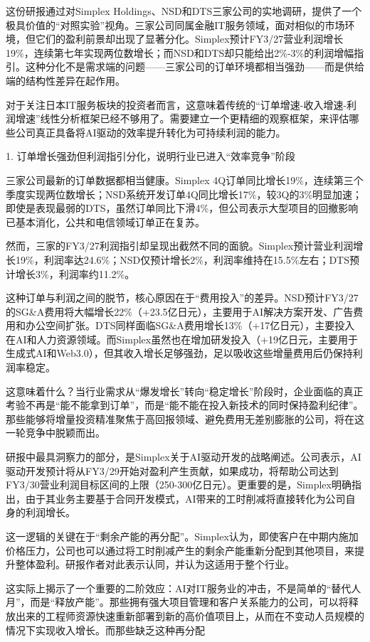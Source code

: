 \documentclass[11pt]{ctexart}
\begin{document}
这份研报通过对Simplex Holdings、NSD和DTS三家公司的实地调研，提供了一个极具价值的“对照实验”视角。三家公司同属金融IT服务领域，面对相似的市场环境，但它们的盈利前景却出现了显著分化。Simplex预计FY3/27营业利润增长19\%，连续第七年实现两位数增长；而NSD和DTS却只能给出2\%-3\%的利润增幅指引。这种分化不是需求端的问题——三家公司的订单环境都相当强劲——而是供给端的结构性差异在起作用。

对于关注日本IT服务板块的投资者而言，这意味着传统的“订单增速-收入增速-利润增速”线性分析框架已经不够用了。需要建立一个更精细的观察框架，来评估哪些公司真正具备将AI驱动的效率提升转化为可持续利润的能力。

1. 订单增长强劲但利润指引分化，说明行业已进入“效率竞争”阶段

三家公司最新的订单数据都相当健康。Simplex 4Q订单同比增长19\%，连续第三个季度实现两位数增长；NSD系统开发订单4Q同比增长17\%，较3Q的3\%明显加速；即使是表现最弱的DTS，虽然订单同比下滑4\%，但公司表示大型项目的回撤影响已基本消化，公共和电信领域订单正在复苏。

然而，三家的FY3/27利润指引却呈现出截然不同的面貌。Simplex预计营业利润增长19\%，利润率达24.6\%；NSD仅预计增长2\%，利润率维持在15.5\%左右；DTS预计增长3\%，利润率约11.2\%。

这种订单与利润之间的脱节，核心原因在于“费用投入”的差异。NSD预计FY3/27的SG\&A费用将大幅增长22\%（+23.5亿日元），主要用于AI解决方案开发、广告费用和办公空间扩张。DTS同样面临SG\&A费用增长13\%（+17亿日元），主要投入在AI和人力资源领域。而Simplex虽然也在增加研发投入（+19亿日元，主要用于生成式AI和Web3.0），但其收入增长足够强劲，足以吸收这些增量费用后仍保持利润率稳定。

这意味着什么？当行业需求从“爆发增长”转向“稳定增长”阶段时，企业面临的真正考验不再是“能不能拿到订单”，而是“能不能在投入新技术的同时保持盈利纪律”。那些能够将增量投资精准聚焦于高回报领域、避免费用无差别膨胀的公司，将在这一轮竞争中脱颖而出。

研报中最具洞察力的部分，是Simplex关于AI驱动开发的战略阐述。公司表示，AI驱动开发预计将从FY3/29开始对盈利产生贡献，如果成功，将帮助公司达到FY3/30营业利润目标区间的上限（250-300亿日元）。更重要的是，Simplex明确指出，由于其业务主要基于合同开发模式，AI带来的工时削减将直接转化为公司自身的利润增长。

这一逻辑的关键在于“剩余产能的再分配”。Simplex认为，即使客户在中期内施加价格压力，公司也可以通过将工时削减产生的剩余产能重新分配到其他项目，来提升整体盈利。研报作者对此表示认同，并认为这适用于整个行业。

这实际上揭示了一个重要的二阶效应：AI对IT服务业的冲击，不是简单的“替代人月”，而是“释放产能”。那些拥有强大项目管理和客户关系能力的公司，可以将释放出来的工程师资源快速重新部署到新的高价值项目上，从而在不变动人员规模的情况下实现收入增长。而那些缺乏这种再分配
\end{document}
